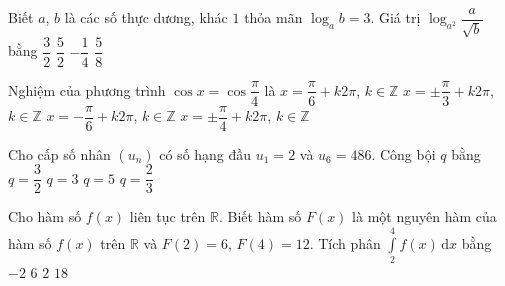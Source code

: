 \begin{ex} %
	Biết $a$, $b$ là các số thực dương, khác $1$ thỏa mãn $\log_a b=3$. Giá trị $\log_{a^2} \dfrac{a}{\sqrt{b}}$ bằng
	\choice
	{$\dfrac{3}{2}$}
	{$\dfrac{5}{2}$}
	{\True $-\dfrac{1}{4}$}
	{$\dfrac{5}{8}$}
\end{ex}
\begin{ex} %
	Nghiệm của phương trình $\cos x=\cos \dfrac{\pi}{4}$ là
	\choice
	{$x=\dfrac{\pi}{6}+k2\pi$, $k \in \mathbb{Z}$}
	{$x=\pm \dfrac{\pi}{3}+k2\pi$, $k \in \mathbb{Z}$}
	{$x=-\dfrac{\pi}{6}+k2\pi$, $k \in \mathbb{Z}$}
	{\True $x=\pm \dfrac{\pi}{4}+k2\pi$, $k \in \mathbb{Z}$}
\end{ex}
\begin{ex} %
	Cho cấp số nhân $(u_n)$ có số hạng đầu $u_1=2$ và $u_6=486$. Công bội $q$ bằng
	\choice
	{$q=\dfrac{3}{2}$}
	{\True $q=3$}
	{$q=5$}
	{ $q=\dfrac{2}{3}$}
\end{ex}
\begin{ex} %
	Cho hàm số $f(x)$ liên tục trên $\mathbb{R}$. Biết hàm số $F(x)$ là một nguyên hàm của hàm số $f(x)$ trên $\mathbb{R}$ và $F(2)=6$, $F(4)=12$. Tích phân $\displaystyle\int\limits_{2}^{4} f(x)\mathrm{\,d}x$ bằng
	\choice
	{$-2$}
	{\True $6$}
	{$2$}
	{$18$}
\end{ex}
